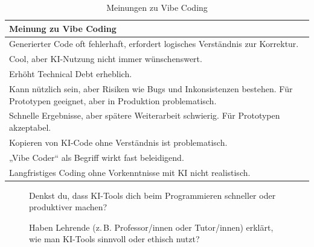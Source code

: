 \documentclass[paper=a4,fontsize=12pt,ngerman]{scrartcl}
\begin{document}
\begin{table}[h]
\small %
\caption{Meinungen zu Vibe Coding} \label{tab:meinungen}
\begin{tabularx}{\textwidth}{X} %
    \toprule
    \textbf{Meinung zu Vibe Coding} \\
    \midrule
    Generierter Code oft fehlerhaft, erfordert logisches Verständnis zur Korrektur. \\
    \midrule
    Cool, aber KI-Nutzung nicht immer wünschenswert. \\
    \midrule
    Erhöht Technical Debt erheblich. \\
    \midrule
    Kann nützlich sein, aber Risiken wie Bugs und Inkonsistenzen bestehen. Für Prototypen geeignet, aber in Produktion problematisch. \\
    \midrule
    Schnelle Ergebnisse, aber spätere Weiterarbeit schwierig. Für Prototypen akzeptabel. \\
    \midrule
    Kopieren von KI-Code ohne Verständnis ist problematisch. \\
    \midrule
    „Vibe Coder“ als Begriff wirkt fast beleidigend. \\
    \midrule
    Langfristiges Coding ohne Vorkenntnisse mit KI nicht realistisch. \\
    \bottomrule
\end{tabularx}
\end{table}

\begin{figure}[ht]
    \centering
    \begin{minipage}[t]{0.45\textwidth}
        \centering
        \caption{Denkst du, dass KI-Tools dich beim Programmieren schneller oder produktiver machen?}
    \end{minipage}
    \hfill
    \begin{minipage}[t]{0.45\textwidth}
        \centering
        \caption{Haben Lehrende (z.\,B. Professor/innen oder Tutor/innen) erklärt, wie man KI-Tools sinnvoll oder ethisch nutzt?}
    \end{minipage}
\end{figure}
\clearpage
\end{document}
